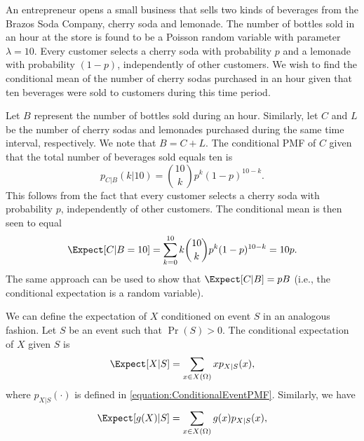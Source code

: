 \begin{example}
An entrepreneur opens a small business that sells two kinds of beverages from the Brazos Soda Company, cherry soda and lemonade.
The number of bottles sold in an hour at the store is found to be a Poisson random variable with parameter $\lambda = 10$.
Every customer selects a cherry soda with probability $p$ and a lemonade with probability $(1 - p)$, independently of other customers.
We wish to find the conditional mean of the number of cherry sodas purchased in an hour given that ten beverages were sold to customers during this time period.

Let $B$ represent the number of bottles sold during an hour.
Similarly, let $C$ and $L$ be the number of cherry sodas and lemonades purchased during the same time interval, respectively.
We note that $B = C + L$.
The conditional PMF of $C$ given that the total number of beverages sold equals ten is
\begin{equation} \label{equation:ConditionalPoisson}
p_{C|B} (k | 10)
= \binom{10}{k} p^k (1-p)^{10-k} .
\end{equation}
This follows from the fact that every customer selects a cherry soda with probability $p$, independently of other customers.
The conditional mean is then seen to equal
\begin{equation*}
\Expect [ C | B=10] = \sum_{k=0}^{10}
k \binom{10}{k} p^k (1-p)^{10-k} = 10 p .
\end{equation*}
The same approach can be used to show that $\Expect [ C | B ] = p B$ (i.e., the conditional expectation is a random variable).
\end{example}

We can define the expectation of $X$ conditioned on event $S$ in an analogous fashion.
Let $S$ be an event such that $\Pr (S) > 0$.
The conditional expectation of $X$ given $S$ is
\begin{equation*}
\Expect [X | S] = \sum_{x \in X(\Omega)} x p_{X|S} (x) ,
\end{equation*}
where $p_{X|S} (\cdot)$ is defined in \eqref{equation:ConditionalEventPMF}.
Similarly, we have
\begin{equation*}
\Expect [g(X) | S] = \sum_{x \in X(\Omega)} g(x) p_{X|S} (x) ,
\end{equation*}

